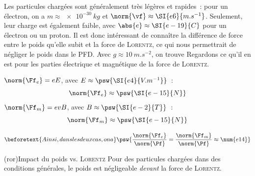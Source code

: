 \documentclass[../../main/main.tex]{subfiles}
\begin{document}
Les particules chargées sont généralement très légères et rapides~: pour un
électron, on a $m \approx \SI{e-30}{kg}$ et $\norm{\vf} \approx
	\SI{e6}{m.s^{-1}}$. Seulement, leur charge est également faible, avec $\abs{e}
	\approx \SI{e-19}{C}$ pour un électron ou un proton. Il est donc intéressant de
connaître la différence de force entre le poids qu'elle subit et la force de
\textsc{Lorentz}, ce qui nous permettrait de négliger le poids dans le PFD.
Avec $g \approx \SI{10}{m.s^{-2}}$, on trouve
Regardons ce qu'il en est pour les parties électrique et magnétique de la force
de \textsc{Lorentz}.
\bigbreak
\begin{itemize}[label=$\diamond$]
	 $\norm{\Ff_e} = eE$, avec $E \approx \psw{
			\SI{e4}{V.m^{-1}}}$~:
	\[\norm{\Ff_e} \approx \psw{\SI{e-15}{N}}\]
	\vspace{-15pt}
	 $\norm{\Ff_m} = evB$, avec $B \approx
		\psw{\SI{e-2}{T}}$~:
	\[\norm{\Ff_m} \approx \psw{\SI{e-15}{N}}\]
	\vspace{-15pt}
\end{itemize}
\vspace{-15pt}
\begin{gather*}
	\beforetext{Ainsi, dans les deux cas, on a}
	\psw{
		\frac{\norm{\Ff_e}}{\norm{\Pf}} = \frac{\norm{\Ff_m}}{\norm{\Pf}} \approx
		\num{e14}
	}
\end{gather*}

\begin{tcb*}(ror){Impact du poids vs. \textsc{Lorentz}}
	Pour des particules chargées dans des conditions générales, le poids est
	négligeable \textit{devant} la force de \textsc{Lorentz}.
\end{tcb*}
\end{document}
